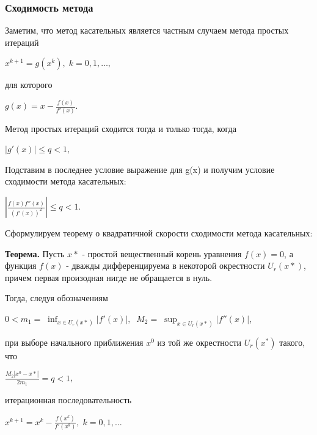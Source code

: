 \documentclass{article}
\begin{document}
			\subsubsection{Сходимость метода}
			
				Заметим, что метод касательных является частным случаем метода простых итераций
				 
				\begin{center}$x^{k+1}=g(x^k),\; k=0,1,\ldots,$\end{center}
				
				для которого

				\begin{center}$g(x)=x-\frac{f(x)}{f'(x)}.$\end{center}
				
				Метод простых итераций сходится тогда и только тогда, когда 
				
				\begin{center}$|g'(x)|\le q < 1,$\end{center}
				
				Подставим в последнее условие выражение для g(x) и получим условие сходимости метода касательных:
				
				\begin{center}$\left|\frac{f(x)f''(x)}{(f'(x))^2}\right| \le q < 1.$\end{center}
				
				Сформулируем теорему о квадратичной скорости сходимости метода касательных:
				
				\textbf{Теорема.} Пусть $x*$ - простой вещественный корень уравнения $f(x) = 0$, а функция $f(x)$ - дважды дифференцируема в некоторой окрестности $U_r(x*)$, причем первая произодная нигде не обращается в нуль.
				
				Тогда, следуя обозначениям
				
				\begin{center}$0 < m_1 = \;\inf_{x\in U_r(x*)}|f'(x)|,\;\; M_2 = \;\sup_{x\in U_r(x*)}|f''(x)|$,\end{center}
				
				при выборе начального приближения $x^0$ из той же окрестности $U_r(x^*)$ такого, что
				
				\begin{center}$\frac{M_2|x^0 - x*|}{2m_1} = q < 1$,\end{center}
				
				итерационная последовательность
				
				\begin{center}$x^{k+1} = x^k - \frac{f(x^k)}{f'(x^k)},\; k = 0,1,\ldots$\end{center}
				
\end{document}
